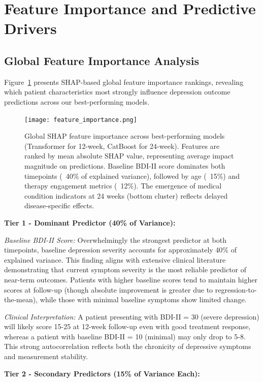 \documentclass[conference]{IEEEtran}
\begin{document}
\section{Feature Importance and Predictive Drivers}

\subsection{Global Feature Importance Analysis}

Figure~\ref{fig:shap_global} presents SHAP-based global feature importance rankings, revealing which patient characteristics most strongly influence depression outcome predictions across our best-performing models.

\begin{figure}[t]
\centering
\texttt{[image: feature\_importance.png]}
\caption{Global SHAP feature importance across best-performing models (Transformer for 12-week, CatBoost for 24-week). Features are ranked by mean absolute SHAP value, representing average impact magnitude on predictions. Baseline BDI-II score dominates both timepoints (~40\% of explained variance), followed by age (~15\%) and therapy engagement metrics (~12\%). The emergence of medical condition indicators at 24 weeks (bottom cluster) reflects delayed disease-specific effects.}
\label{fig:shap_global}
\end{figure}

\textbf{Tier 1 - Dominant Predictor (40\% of Variance):}

\textit{Baseline BDI-II Score:} Overwhelmingly the strongest predictor at both timepoints, baseline depression severity accounts for approximately 40\% of explained variance. This finding aligns with extensive clinical literature demonstrating that current symptom severity is the most reliable predictor of near-term outcomes. Patients with higher baseline scores tend to maintain higher scores at follow-up (though absolute improvement is greater due to regression-to-the-mean), while those with minimal baseline symptoms show limited change.

\textit{Clinical Interpretation:} A patient presenting with BDI-II = 30 (severe depression) will likely score 15-25 at 12-week follow-up even with good treatment response, whereas a patient with baseline BDI-II = 10 (minimal) may only drop to 5-8. This strong autocorrelation reflects both the chronicity of depressive symptoms and measurement stability.

\textbf{Tier 2 - Secondary Predictors (15\% of Variance Each):}
\end{document}
